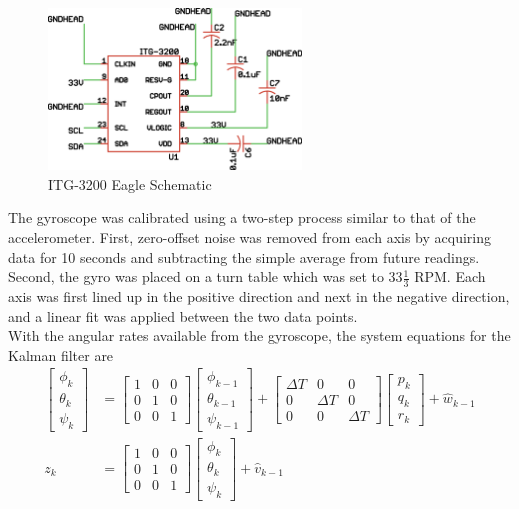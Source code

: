 \begin{figure}[h!]
  \caption{ITG-3200 Eagle Schematic} \label{itg3200Schematic}
  \centering
    \includegraphics[width=0.6\textwidth]{figures/itg3200Schematic.eps}
\end{figure}

The gyroscope was calibrated using a two-step process similar to that of the accelerometer. First, zero-offset noise was removed from each axis by acquiring data for 10 seconds and subtracting the simple average from future readings. Second, the gyro was placed on a turn table which was set to $33 \frac{1}{3}$ RPM. Each axis was first lined up in the positive direction and next in the negative direction, and a linear fit was applied between the two data points.\\

With the angular rates available from the gyroscope, the system equations for the Kalman filter are
\begin{align}
\begin{bmatrix}
\phi_{k}\\
\theta_{k}\\
\psi_{k}
\end{bmatrix} & = \begin{bmatrix}
1 & 0 & 0\\0 & 1 & 0\\0 & 0 & 1
\end{bmatrix}\begin{bmatrix}
\phi_{k-1}\\
\theta_{k-1}\\
\psi_{k-1}
\end{bmatrix}
+ \begin{bmatrix}
\Delta T & 0 & 0 \\ 0 & \Delta T & 0\\0 & 0 & \Delta T
\end{bmatrix}\begin{bmatrix} 
p_k \\ q_k \\ r_k 
\end{bmatrix}+\hat{w}_{k-1}\\
z_k & = \begin{bmatrix}
1 & 0 &0\\0&1&0\\0&0&1
\end{bmatrix}\begin{bmatrix}
\phi_{k}\\
\theta_{k}\\
\psi_{k}
\end{bmatrix}+\hat{v}_{k-1}
\end{align}

